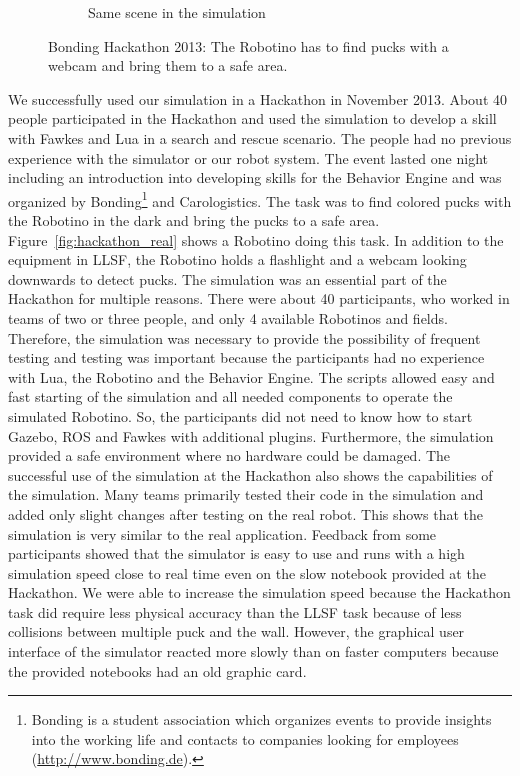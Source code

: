 \begin{figure}
\begin{subfigure}[b]{0.47\textwidth}
    \caption{Same scene in the simulation\\}
    \label{fig:hackathon_sim}
  \end{subfigure}
  \caption[Bonding Hackathon 2013]{Bonding Hackathon 2013: The Robotino has to find pucks with a webcam and bring them to a safe area.}
  \label{fig:hackathon}
\end{figure}
We successfully used our simulation in a Hackathon in November 2013. About 40 people participated in the Hackathon and used the simulation to develop a skill with Fawkes and Lua in a search and rescue scenario. The people had no previous experience with the simulator or our robot system. The event lasted one night including an introduction into developing skills for the Behavior Engine and was organized by Bonding\footnote{Bonding is a student association which organizes events to provide insights into the working life and contacts to companies looking for employees (\url{http://www.bonding.de}).} and Carologistics. The task was to find colored pucks with the Robotino in the dark and bring the pucks to a safe area. Figure~\ref{fig:hackathon_real} shows a Robotino doing this task. In addition to the equipment in LLSF, the Robotino holds a flashlight and a webcam looking downwards to detect pucks. The simulation was an essential part of the Hackathon for multiple reasons. There were about 40 participants, who worked in teams of two or three people, and only 4 available Robotinos and fields. Therefore, the simulation was necessary to provide the possibility of frequent testing and testing was important because the participants had no experience with Lua, the Robotino and the Behavior Engine. The scripts allowed easy and fast starting of the simulation and all needed components to operate the simulated Robotino. So, the participants did not need to know how to start Gazebo, ROS and Fawkes with additional plugins. Furthermore, the simulation provided a safe environment where no hardware could be damaged. The successful use of the simulation at the Hackathon also shows the capabilities of the simulation. Many teams primarily tested their code in the simulation and added only slight changes after testing on the real robot. This shows that the simulation is very similar to the real application. Feedback from some participants showed that the simulator is easy to use and runs with a high simulation speed close to real time even on the slow notebook provided at the Hackathon. We were able to increase the simulation speed because the Hackathon task did require less physical accuracy than the LLSF task because of less collisions between multiple puck and the wall. However, the graphical user interface of the simulator reacted more slowly than on faster computers because the provided notebooks had an old graphic card.\\
